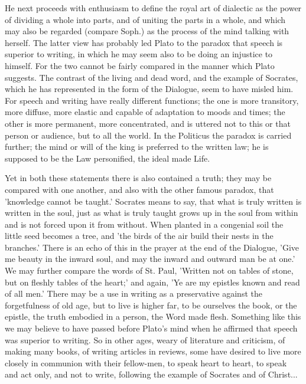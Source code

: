 \documentclass[11pt,letter]{article}
\begin{document}
\par  He next proceeds with enthusiasm to define the royal art of dialectic as the power of dividing a whole into parts, and of uniting the parts in a whole, and which may also be regarded (compare Soph.) as the process of the mind talking with herself. The latter view has probably led Plato to the paradox that speech is superior to writing, in which he may seem also to be doing an injustice to himself. For the two cannot be fairly compared in the manner which Plato suggests. The contrast of the living and dead word, and the example of Socrates, which he has represented in the form of the Dialogue, seem to have misled him. For speech and writing have really different functions; the one is more transitory, more diffuse, more elastic and capable of adaptation to moods and times; the other is more permanent, more concentrated, and is uttered not to this or that person or audience, but to all the world. In the Politicus the paradox is carried further; the mind or will of the king is preferred to the written law; he is supposed to be the Law personified, the ideal made Life.

\par  Yet in both these statements there is also contained a truth; they may be compared with one another, and also with the other famous paradox, that 'knowledge cannot be taught.' Socrates means to say, that what is truly written is written in the soul, just as what is truly taught grows up in the soul from within and is not forced upon it from without. When planted in a congenial soil the little seed becomes a tree, and 'the birds of the air build their nests in the branches.' There is an echo of this in the prayer at the end of the Dialogue, 'Give me beauty in the inward soul, and may the inward and outward man be at one.' We may further compare the words of St. Paul, 'Written not on tables of stone, but on fleshly tables of the heart;' and again, 'Ye are my epistles known and read of all men.' There may be a use in writing as a preservative against the forgetfulness of old age, but to live is higher far, to be ourselves the book, or the epistle, the truth embodied in a person, the Word made flesh. Something like this we may believe to have passed before Plato's mind when he affirmed that speech was superior to writing. So in other ages, weary of literature and criticism, of making many books, of writing articles in reviews, some have desired to live more closely in communion with their fellow-men, to speak heart to heart, to speak and act only, and not to write, following the example of Socrates and of Christ...
\end{document}
